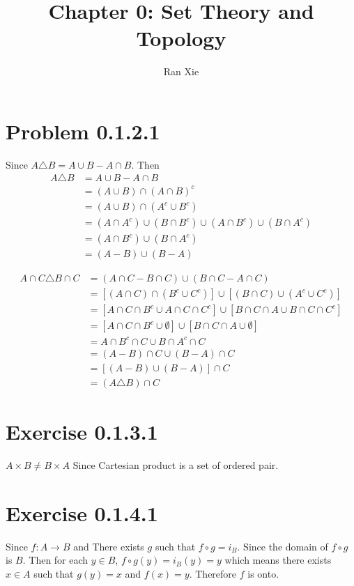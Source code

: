 \documentclass[12pt]{article}
\title{Chapter 0: Set Theory and Topology}
\author{Ran Xie}
\begin{document}
\maketitle
	
\section*{Problem 0.1.2.1}
Since $A \triangle B = A \cup B - A \cap B$. Then 
$$ \begin{aligned}
	A \triangle B &= A \cup B - A \cap B \\
	&= (A \cup B) \cap (A \cap B)^c \\
	&= (A \cup B) \cap (A^c \cup B^c) \\
	&= (A \cap A^c) \cup (B \cap B^c) \cup (A \cap B^c) \cup (B \cap A^c) \\
	&= (A \cap B^c) \cup (B \cap A^c) \\
	&= (A - B) \cup (B - A)
\end{aligned}
$$

$$ \begin{aligned}
	A \cap C \triangle B \cap C &= (A \cap C - B \cap C) \cup (B \cap C - A \cap C) \\
	&= [(A\cap C) \cap (B^c \cup C^c)] \cup [ (B \cap C) \cup (A^c \cup C^c)] \\
	&= [A \cap C \cap B^c \cup A \cap C \cap C^c ] \cup [ B \cap C \cap A \cup B \cap C \cap C^c] \\
	&= [A \cap C \cap B^c \cup \emptyset ] \cup [ B \cap C \cap A \cup \emptyset] \\
	&=  A \cap B^c \cap C \cup  B \cap A^c \cap C  \\
	&= (A-B)\cap C  \cup (B - A) \cap C \\
	&=  [(A - B) \cup (B-A)] \cap C \\
	&= 	(A \triangle B) \cap C   
\end{aligned}
$$
\section*{Exercise 0.1.3.1}
$A \times B \neq B \times A$ Since Cartesian product is a set of ordered pair. 

\section*{Exercise 0.1.4.1}
Since $f : A \rightarrow B$ and There exists $g$ such that $f \circ g = i_B$.  Since the domain of $f \circ g$ is $B$. Then for each $y \in B$, $f \circ g(y) = i_B(y) = y$ which means there exists $x \in A$ such that $g(y) = x$ and $f(x) = y$. Therefore $f$ is onto.  \QED
\end{document}
